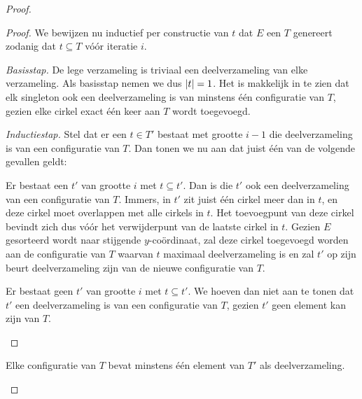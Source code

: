 \begin{proof}
\begin{proof}

We bewijzen nu inductief per constructie van $t$ dat $E$ een $T$
genereert zodanig dat $t \subseteq T$ v\'o\'or iteratie $i$.

\textit{Basisstap.} De lege verzameling is triviaal een
deelverzameling van elke verzameling. Als basisstap nemen we dus
$\left|t\right| = 1$. Het is makkelijk in te zien dat elk singleton ook
een deelverzameling is van minstens \'e\'en configuratie van $T$, gezien
elke cirkel exact \'e\'en keer aan $T$ wordt toegevoegd.

\textit{Inductiestap.} Stel dat er een $t \in T'$ bestaat met grootte
$i - 1$ die deelverzameling is van een configuratie van $T$. Dan tonen
we nu aan dat juist \'e\'en van de volgende gevallen geldt:

\begin{geval}
Er bestaat een $t'$ van grootte $i$ met $t \subseteq t'$. Dan is die
$t'$ ook een deelverzameling van een configuratie van $T$. Immers, in
$t'$ zit juist \'e\'en cirkel meer dan in $t$, en deze cirkel moet
overlappen met alle cirkels in $t$. Het toevoegpunt van deze cirkel
bevindt zich dus v\'o\'or het verwijderpunt van de laatste cirkel in
$t$. Gezien $E$ gesorteerd wordt naar stijgende $y$-co\"ordinaat, zal
deze cirkel toegevoegd worden aan de configuratie van $T$ waarvan $t$
maximaal deelverzameling is en zal $t'$ op zijn beurt deelverzameling
zijn van de nieuwe configuratie van $T$.
\end{geval}

\begin{geval}
Er bestaat geen $t'$ van grootte $i$ met $t \subseteq t'$. We hoeven
dan niet aan te tonen dat $t'$ een deelverzameling is van een
configuratie van $T$, gezien $t'$ geen element kan zijn van $T$.
\end{geval}

\end{proof}

\begin{gevolg}
Elke configuratie van $T$ bevat minstens \'e\'en element van $T'$ als
deelverzameling.
\label{gevolg:sweepline}
\end{gevolg}



\end{proof}
